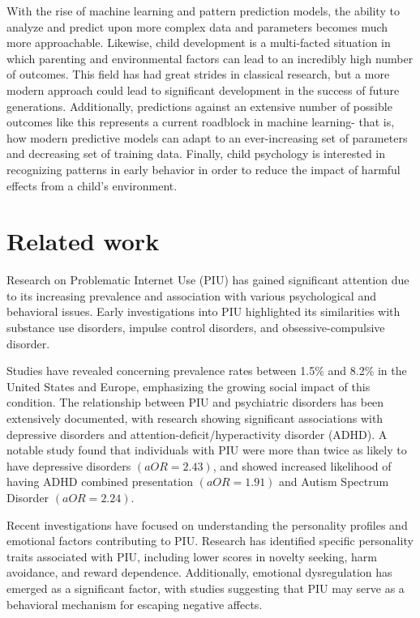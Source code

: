 \documentclass[11pt]{extarticle}
\begin{document}
    With the rise of machine learning and pattern prediction models, the ability to analyze and predict upon more complex data and parameters becomes much more approachable.
    Likewise, child development is a multi-facted situation in which parenting and environmental factors can lead to an incredibly high number of outcomes.
    This field has had great strides in classical research, but a more modern approach could lead to significant development in the success of future generations.
    Additionally, predictions against an extensive number of possible outcomes like this represents a current roadblock in machine learning- that is, how modern predictive models can adapt to an ever-increasing set of parameters and decreasing set of training data.
    Finally, child psychology is interested in recognizing patterns in early behavior in order to reduce the impact of harmful effects from a child's environment.

\section{Related work} 

    Research on Problematic Internet Use (PIU) has gained significant attention due to its increasing prevalence and association with various psychological and behavioral issues. Early investigations into PIU highlighted its similarities with substance use disorders, impulse control disorders, and obsessive-compulsive disorder.
    
    Studies have revealed concerning prevalence rates between 1.5\% and 8.2\% in the United States and Europe, emphasizing the growing social impact of this condition. 
    The relationship between PIU and psychiatric disorders has been extensively documented, with research showing significant associations with depressive disorders and attention-deficit/hyperactivity disorder (ADHD). 
    A notable study found that individuals with PIU were more than twice as likely to have depressive disorders $(aOR = 2.43)$, and showed increased likelihood of having ADHD combined presentation $(aOR = 1.91)$ and Autism Spectrum Disorder $(aOR = 2.24)$.
    
    Recent investigations have focused on understanding the personality profiles and emotional factors contributing to PIU. Research has identified specific personality traits associated with PIU, including lower scores in novelty seeking, harm avoidance, and reward dependence. 
    Additionally, emotional dysregulation has emerged as a significant factor, with studies suggesting that PIU may serve as a behavioral mechanism for escaping negative affects.
    
\end{document}
